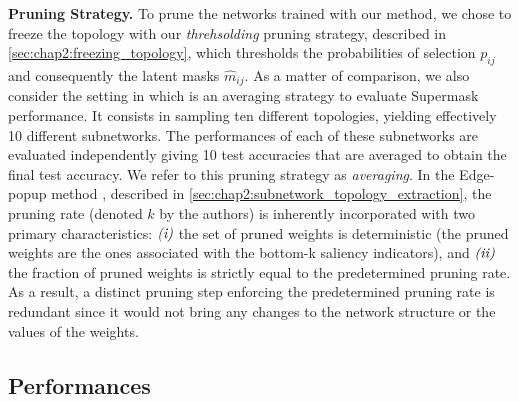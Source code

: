 \noindent\textbf{Pruning Strategy.} To prune the networks trained with our
method, we chose to freeze the topology with our \emph{threhsolding} pruning
strategy, described in \cref{sec:chap2:freezing_topology}, which thresholds the
probabilities of selection $p_{ij}$ and consequently the latent masks
$\hat{m}_{ij}$. As a matter of comparison, we also consider the setting in
\cite{DBLP:conf/nips/ZhouLLY19} which is an averaging strategy to evaluate
Supermask performance. It consists in sampling ten different topologies,
yielding effectively 10 different subnetworks. The performances of each of these
subnetworks are evaluated independently giving 10 test accuracies that are
averaged to obtain the final test accuracy. We refer to this pruning strategy as
\textit{averaging}. In the Edge-popup method
\cite{DBLP:conf/cvpr/RamanujanWKFR20}, described in
\cref{sec:chap2:subnetwork_topology_extraction}, the pruning rate (denoted $k$
by the authors) is inherently incorporated with two primary characteristics:
$\emph{(i)}$ the set of pruned weights is deterministic (the pruned weights are
the ones associated with the bottom-k saliency indicators), and $\emph{(ii)}$
the fraction of pruned weights is strictly equal to the predetermined pruning
rate. As a result, a distinct pruning step enforcing the predetermined pruning
rate is redundant since it would not bring any changes to the network structure
or the values of the weights.\\

\subsection{Performances}
\label{sec:chap2:performances}

